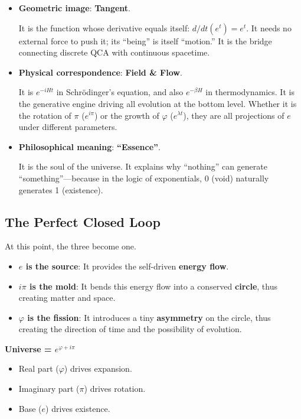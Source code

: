 \begin{itemize}
\item \textbf{Geometric image}: \textbf{Tangent}.

    It is the function whose derivative equals itself: $d/dt(e^t) = e^t$. It needs no external force to push it; its ``being'' is itself ``motion.'' It is the bridge connecting discrete QCA with continuous spacetime.

\item \textbf{Physical correspondence}: \textbf{Field \& Flow}.

    It is $e^{-iHt}$ in Schrödinger's equation, and also $e^{-\beta H}$ in thermodynamics. It is the generative engine driving all evolution at the bottom level. Whether it is the rotation of $\pi$ ($e^{i\pi}$) or the growth of $\varphi$ ($e^{\lambda t}$), they are all projections of $e$ under different parameters.

\item \textbf{Philosophical meaning}: \textbf{``Essence''}.

    It is the soul of the universe. It explains why ``nothing'' can generate ``something''---because in the logic of exponentials, 0 (void) naturally generates 1 (existence).
\end{itemize}

\subsection{The Perfect Closed Loop}

At this point, the three become one.

\begin{itemize}
\item \textbf{$e$ is the source}: It provides the self-driven \textbf{energy flow}.

\item \textbf{$i\pi$ is the mold}: It bends this energy flow into a conserved \textbf{circle}, thus creating matter and space.

\item \textbf{$\varphi$ is the fission}: It introduces a tiny \textbf{asymmetry} on the circle, thus creating the direction of time and the possibility of evolution.
\end{itemize}

\textbf{Universe = $e^{\varphi + i\pi}$}

\begin{itemize}
\item Real part ($\varphi$) drives expansion.

\item Imaginary part ($\pi$) drives rotation.

\item Base ($e$) drives existence.
\end{itemize}


